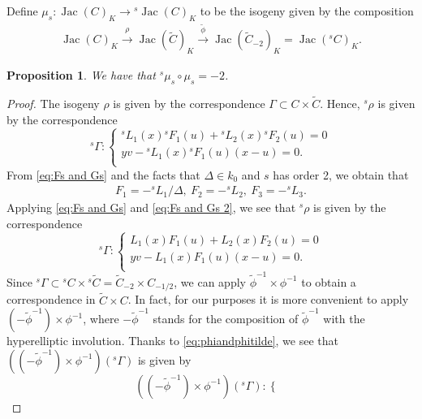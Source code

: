 \documentclass[oneside]{amsart}
\newtheorem{proposition}[theorem]{Proposition}
\theoremstyle{remark}
\newcommand{\lra}{\longrightarrow}
\newcommand{\ra}{\rightarrow}
\newcommand{\Jac}{\operatorname{Jac}}
\numberwithin{equation}{section}
\begin{document}
Define $\mu_{s} \colon \Jac(C)_K\ra {{}^{s}\Jac}(C)_K$ to be the isogeny given by the composition
\begin{align*}
  \Jac(C)_K\stackrel{\rho}{\lra} \Jac(\tilde{C})_K \stackrel{\tilde{\phi}}{\lra}\Jac(\tilde{C}_{-2})_K = \Jac({{}^{s} C})_K.
\end{align*}

\begin{proposition}\label{prop: mus}
  We have that ${{}^{s} \mu_{s} }\circ \mu_{s} = -2$.
\end{proposition}
\begin{proof}
  The isogeny $\rho$ is given by the correspondence $\Gamma\subset C\times \tilde C$. Hence, ${}^{s}\rho$ is given by the correspondence
\begin{equation*}
    {{}^{s}\Gamma}:\begin{cases}
    {}^{s}L_1(x){}^{s}F_1(u) + {}^{s}L_2(x){}^{s}F_2(u) = 0\\
    y v - {}^{s}L_1(x){}^{s}F_1(u) (x-u)=0.\\
    \end{cases}
  \end{equation*}
From \eqref{eq:Fs and Gs} and the facts that $\Delta\in k_0$ and $s$ has order 2, we obtain that
\begin{align}\label{eq:Fs and Gs 2}
   F_1 = -   {}^{s}L_1 /\Delta,\   F_2 = -  {}^{s}L_2 ,\ 
  F_3 = -  {}^{s}L_3.
\end{align}
Applying \eqref{eq:Fs and Gs} and \eqref{eq:Fs and Gs 2}, we see that ${}^{s}\rho$ is given by the correspondence
\begin{equation*}
    {{}^{s}\Gamma}:\begin{cases}
    L_1(x)F_1(u) + L_2(x)F_2(u) = 0\\
    y v - L_1(x)F_1(u) (x-u)=0.\\
    \end{cases}
  \end{equation*}
Since ${}^{s} \Gamma\subset {}^{s} C \times {}^{s} \tilde C=\tilde C_{-2}\times C_{-1/2}$, we can apply $ \tilde\phi^{-1}\times \phi^{-1}$ to obtain a correspondence in $\tilde C\times C$. In fact, for our purposes it is more convenient to apply $ (-\tilde\phi^{-1})\times \phi^{-1}$, where $-\tilde\phi^{-1}$ stands for the composition of $\tilde \phi^{-1}$ with the hyperelliptic involution. Thanks to \eqref{eq:phiandphitilde}, we see that $((-\tilde\phi^{-1})\times \phi^{-1})({{}^{s}\Gamma})$ is given by
\begin{equation}\label{eq:corr}
    ((-\tilde\phi^{-1})\times \phi^{-1})({{}^{s}\Gamma}):\begin{cases}

\end{cases}
\end{equation}
\end{proof}
\end{document}
